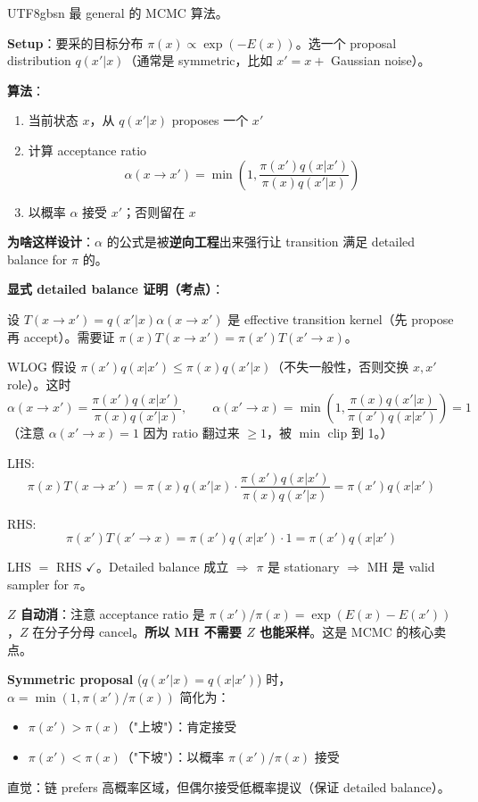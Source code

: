 \documentclass[11pt]{article}
\begin{document}
\begin{CJK}{UTF8}{gbsn}
最 general 的 MCMC 算法。

\textbf{Setup}：要采的目标分布 $\pi(x) \propto \exp(-E(x))$。选一个 proposal distribution $q(x' | x)$（通常是 symmetric，比如 $x' = x + $ Gaussian noise）。

\textbf{算法}：
\begin{enumerate}[nosep]
  \item 当前状态 $x$，从 $q(x' | x)$ proposes 一个 $x'$
  \item 计算 acceptance ratio
  \[
  \alpha(x \to x') = \min\!\left(1, \frac{\pi(x') q(x | x')}{\pi(x) q(x' | x)}\right)
  \]
  \item 以概率 $\alpha$ 接受 $x'$；否则留在 $x$
\end{enumerate}

\textbf{为啥这样设计}：$\alpha$ 的公式是被\textbf{逆向工程}出来强行让 transition 满足 detailed balance for $\pi$ 的。

\textbf{显式 detailed balance 证明（考点）}：

设 $T(x \to x') = q(x' | x) \alpha(x \to x')$ 是 effective transition kernel（先 propose 再 accept）。需要证 $\pi(x) T(x \to x') = \pi(x') T(x' \to x)$。

WLOG 假设 $\pi(x') q(x | x') \leq \pi(x) q(x' | x)$（不失一般性，否则交换 $x, x'$ role）。这时
\[
\alpha(x \to x') = \frac{\pi(x') q(x | x')}{\pi(x) q(x' | x)}, \qquad \alpha(x' \to x) = \min\!\left(1, \frac{\pi(x) q(x' | x)}{\pi(x') q(x | x')}\right) = 1
\]
（注意 $\alpha(x' \to x) = 1$ 因为 ratio 翻过来 $\geq 1$，被 $\min$ clip 到 1。）

LHS:
\[
\pi(x) T(x \to x') = \pi(x) q(x' | x) \cdot \frac{\pi(x') q(x | x')}{\pi(x) q(x' | x)} = \pi(x') q(x | x')
\]

RHS:
\[
\pi(x') T(x' \to x) = \pi(x') q(x | x') \cdot 1 = \pi(x') q(x | x')
\]

LHS $=$ RHS $\checkmark$。Detailed balance 成立 $\Rightarrow$ $\pi$ 是 stationary $\Rightarrow$ MH 是 valid sampler for $\pi$。

\textbf{$Z$ 自动消}：注意 acceptance ratio 是 $\pi(x') / \pi(x) = \exp(E(x) - E(x'))$，$Z$ 在分子分母 cancel。\textbf{所以 MH 不需要 $Z$ 也能采样}。这是 MCMC 的核心卖点。

\textbf{Symmetric proposal} ($q(x'|x) = q(x|x')$) 时，$\alpha = \min(1, \pi(x')/\pi(x))$ 简化为：
\begin{itemize}[nosep]
  \item $\pi(x') > \pi(x)$（"上坡"）：肯定接受
  \item $\pi(x') < \pi(x)$（"下坡"）：以概率 $\pi(x')/\pi(x)$ 接受
\end{itemize}
直觉：链 prefers 高概率区域，但偶尔接受低概率提议（保证 detailed balance）。


\end{CJK}
\end{document}
